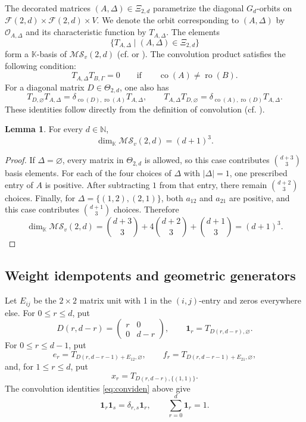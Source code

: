 \documentclass[12pt]{amsart}
\numberwithin{equation}{section}
\theoremstyle{definition}
\newtheorem{lemma}[theorem]{Lemma}
\theoremstyle{definition}
\newcommand{\kk}{\mathbb K}
\newcommand{\MS}{\mathcal{MS}_v(2,d)}
\newcommand{\ro}{\operatorname{ro}}
\newcommand{\co}{\operatorname{co}}
\newcommand{\cF}{\mathcal F}
\newcommand{\cO}{\mathcal O}
\begin{document}
The decorated matrices $(A,\Delta)\in\Xi_{2,d}$ parametrize the diagonal $G_d$-orbits on $\cF(2,d)\times\cF(2,d)\times V$. We denote the orbit corresponding to $(A,\Delta)$ by $\cO_{A,\Delta}$ and its characteristic function by $T_{A,\Delta}$. The elements
$$
\{T_{A,\Delta}\mid(A,\Delta)\in\Xi_{2,d}\}
$$
form a $\kk$-basis of $\MS$ (cf. \cite[Definition~2.2 \& Section~3]{Ros18} or \cite{MWZ99}). The convolution product satisfies the following condition:
$$
T_{A,\Delta}T_{B,\Gamma}=0
\qquad\text{if}\qquad
\co(A)\ne\ro(B).
$$
For a diagonal matrix $D\in\Theta_{2,d}$, one also has
\begin{equation}\label{eq:conviden}
    T_{D,\varnothing}T_{A,\Delta}
=\delta_{\co(D),\ro(A)}T_{A,\Delta},\qquad T_{A,\Delta}T_{D,\varnothing}
=\delta_{\co(A),\ro(D)}T_{A,\Delta}.
\end{equation}
These identities follow directly from the definition of convolution (cf. \cite[(2.3)]{Ros18}).

\begin{lemma}\label{lem:geomdim}
For every $d\in\mathbb N$,
$$
\dim_{\kk}\MS=(d+1)^3.
$$
\end{lemma}
\begin{proof}
    If $\Delta=\varnothing$, every matrix in $\Theta_{2,d}$ is allowed, so this case contributes $\binom{d+3}{3}$ basis elements. For each of the four choices of $\Delta$ with $|\Delta|=1$, one prescribed entry of $A$ is positive. After subtracting $1$ from that entry, there remain $\binom{d+2}{3}$ choices. Finally, for $\Delta=\{(1,2),(2,1)\}$, both $a_{12}$ and $a_{21}$ are positive, and this case contributes $\binom{d+1}{3}$ choices. Therefore
$$
\dim_{\kk}\MS
=\binom{d+3}{3}+4\binom{d+2}{3}+\binom{d+1}{3}=(d+1)^3.  
$$
\end{proof}

\subsection{Weight idempotents and geometric generators}\label{subsec:geomgen}

Let $E_{ij}$ be the $2\times2$ matrix unit with 1 in the $(i,j)$-entry and zeros everywhere else. For $0\le r\le d$, put
$$
D(r,d-r)=
\begin{pmatrix}
r&0\\
0&d-r
\end{pmatrix},
\qquad
\mathbf1_r=T_{D(r,d-r),\varnothing}.
$$
For $0\le r\le d-1$, put
$$
e_r=T_{D(r,d-r-1)+E_{12},\varnothing},
\qquad
f_r=T_{D(r,d-r-1)+E_{21},\varnothing},
$$
and, for $1\le r\le d$, put
$$
x_r=T_{D(r,d-r),\{(1,1)\}}.
$$
The convolution identities \eqref{eq:conviden} above give
\begin{equation}\label{eq:orthbfirs}
    \mathbf1_r\mathbf1_s=\delta_{r,s}\mathbf1_r,
\qquad
\sum_{r=0}^{d}\mathbf1_r=1.
\end{equation}
\end{document}
